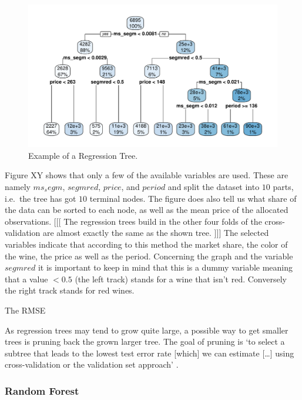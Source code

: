 \documentclass[11pt,]{article}
\begin{document}
\begin{figure}
\centering
\includegraphics{../00_data/output_paper/09_tree.pdf}
\caption{Example of a Regression Tree.}
\end{figure}

Figure XY shows that only a few of the available variables are used.
These are namely \(ms_segm\), \(segmred\), \(price\), and \(period\) and
split the dataset into \(10\) parts, i.e.~the tree has got \(10\)
terminal nodes. The figure does also tell us what share of the data can
be sorted to each node, as well as the mean price of the allocated
observations. {[}{[}{[} The regression trees build in the other four
folds of the cross-validation are almost exactly the same as the shown
tree. {]}{]}{]} The selected variables indicate that according to this
method the market share, the color of the wine, the price as well as the
period. Concerning the graph and the variable \(segmred\) it is
important to keep in mind that this is a dummy variable meaning that a
value \(< 0.5\) (the left track) stands for a wine that isn't red.
Conversely the right track stands for red wines.

The RMSE

As regression trees may tend to grow quite large, a possible way to get
smaller trees is pruning back the grown larger tree. The goal of pruning
is `to select a subtree that leads to the lowest test error rate
{[}which{]} we can estimate {[}\ldots{}{]} using cross-validation or the
validation set approach' \autocite[p.~308]{James2014}.

\hypertarget{random-forest}{%
\subsubsection{Random Forest}\label{random-forest}}
\end{document}
